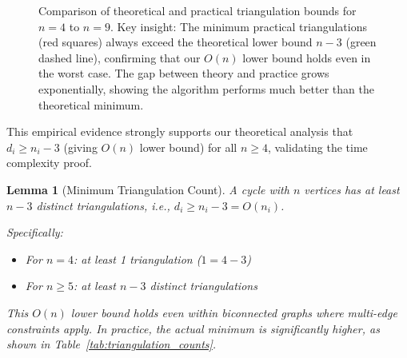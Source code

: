 \documentclass[12pt,a4paper]{article}
\newtheorem{lemma}[theorem]{Lemma}
\theoremstyle{definition}
\theoremstyle{remark}
\begin{document}
\begin{figure}[H]
\centering
{}
\caption{Comparison of theoretical and practical triangulation bounds for $n = 4$ to $n = 9$. Key insight: The minimum practical triangulations (red squares) always exceed the theoretical lower bound $n-3$ (green dashed line), confirming that our $O(n)$ lower bound holds even in the worst case. The gap between theory and practice grows exponentially, showing the algorithm performs much better than the theoretical minimum.}
\label{fig:triangulation_growth}
\end{figure}

This empirical evidence strongly supports our theoretical analysis that $d_i \geq n_i - 3$ (giving $O(n)$ lower bound) for all $n \geq 4$, validating the time complexity proof.

\begin{lemma}[Minimum Triangulation Count]
\label{lem:min_triangulations}
A cycle with $n$ vertices has at least $n - 3$ distinct triangulations, i.e., $d_i \geq n_i - 3 = O(n_i)$.

Specifically:
\begin{itemize}
    \item For $n = 4$: at least 1 triangulation ($1 = 4 - 3$)
    \item For $n \geq 5$: at least $n - 3$ distinct triangulations
\end{itemize}

This $O(n)$ lower bound holds even within biconnected graphs where multi-edge constraints apply. In practice, the actual minimum is significantly higher, as shown in Table~\ref{tab:triangulation_counts}.
\end{lemma}
\end{document}
